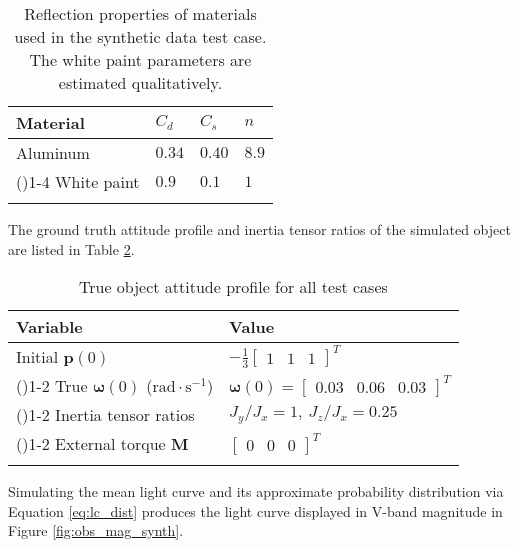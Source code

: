 \documentclass[a4paper,twocolumn]{spaceDebrisC} %
\newcommand{\grule}[0]{\arrayrulecolor{darkgray}\cmidrule(){1-2}}
\newcommand{\brule}[0]{\arrayrulecolor{black} \bottomrule}
\newcommand{\vctr}[1]{\bm{#1}}
\begin{document}
\begin{table}[H]
  \centering
  \renewcommand{\arraystretch}{1.3} %
  \caption{Reflection properties of materials used in the synthetic data test case. The white paint parameters are estimated qualitatively.}
  \vspace*{6pt}
  \begin{tabular}{@{} l l l l @{}}
    \toprule
    Material & $C_d$ & $C_s$ & $n$ \\ \midrule
    Aluminum \cite{fankhauser2023} & $0.34$ & $0.40$ & $8.9$ \\ \arrayrulecolor{darkgray}\cmidrule(){1-4}
    White paint & $0.9$ & $0.1$ & $1$ \\ \brule
  \end{tabular}
  \label{tb:synth_matprops}
\end{table}

The ground truth attitude profile and inertia tensor ratios of the simulated object are listed in Table \ref{tb:synth_att}.

\begin{table}[H]
  \centering
  \renewcommand{\arraystretch}{1.3} %
  \caption{True object attitude profile for all test cases}
  \vspace*{6pt}
  \begin{tabular}{@{} l l @{}}
    \toprule
    Variable & Value \\ \midrule
    Initial $\vctr{p}(0)$ & $-\frac{1}{3} \begin{bmatrix} 1 & 1 & 1 \end{bmatrix}^T$ \\ \grule
    True $\vctr{\omega}(0)$ ($\text{rad}\cdot\text{s}^{-1}$) & $\vctr{\omega}(0) = \begin{bmatrix} 0.03 & 0.06 & 0.03 \end{bmatrix}^T$ \\ \grule
    Inertia tensor ratios & $J_y / J_x = 1, \: J_z / J_x = 0.25$ \\ \grule
    External torque $\vctr{M}$ & $\begin{bmatrix} 0 & 0 & 0 \end{bmatrix}^T$ \\ \brule
  \end{tabular}
  \label{tb:synth_att}
\end{table}
\FloatBarrier


Simulating the mean light curve and its approximate probability distribution via Equation \ref{eq:lc_dist} produces the light curve displayed in V-band magnitude in Figure \ref{fig:obs_mag_synth}.
\end{document}
